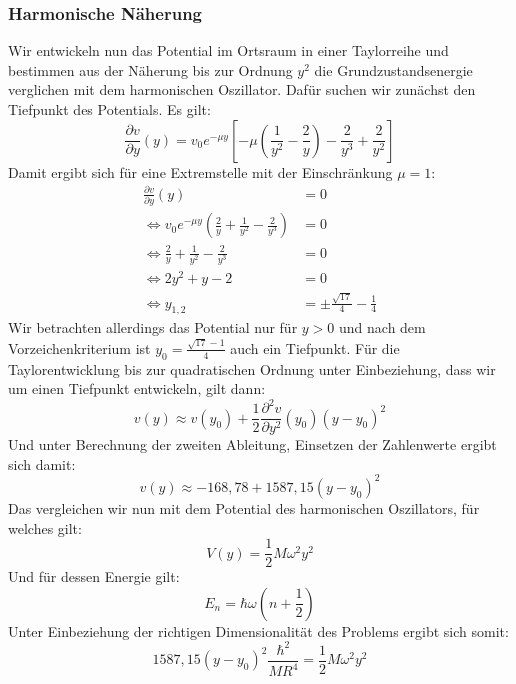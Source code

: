 \documentclass[11pt,a4paper]{article}
\begin{document}
\subsubsection*{Harmonische Näherung}
Wir entwickeln nun das Potential im Ortsraum in einer Taylorreihe und bestimmen aus der Näherung bis zur Ordnung $y^2$ die Grundzustandsenergie verglichen mit dem harmonischen Oszillator.
Dafür suchen wir zunächst den Tiefpunkt des Potentials. Es gilt:
\begin{equation*}
	\frac{\partial v}{\partial y}(y) = v_0e^{-\mu y}\left[-\mu\left(\frac{1}{y^2}-\frac{2}{y}\right)-\frac{2}{y^3}+\frac{2}{y^2}\right]
\end{equation*}
Damit ergibt sich für eine Extremstelle mit der Einschränkung $\mu = 1$:
\begin{align*}
	\frac{\partial v}{\partial y}(y) &= 0 \\
	\Leftrightarrow
	v_0e^{-\mu y}\left(\frac{2}{y}+\frac{1}{y^2}-\frac{2}{y^3}\right) &= 0 \\
	\Leftrightarrow
	\frac{2}{y}+\frac{1}{y^2}-\frac{2}{y^3} &= 0\\
	\Leftrightarrow
	2y^2 + y -2 &= 0 \\
	\Leftrightarrow
	y_{1,2} &= \pm\frac{\sqrt{17}}{4}-\frac{1}{4}
\end{align*}
Wir betrachten allerdings das Potential nur für $y>0$ und nach dem Vorzeichenkriterium ist $y_0 = \frac{\sqrt{17}-1}{4}$ auch ein Tiefpunkt. Für die Taylorentwicklung bis zur quadratischen Ordnung unter Einbeziehung, dass wir um einen Tiefpunkt entwickeln, gilt dann:
\begin{equation}
	v(y) \approx v(y_0) + \frac{1}{2}\frac{\partial^2 v}{\partial y^2}(y_0)(y-y_0)^2
\end{equation}
Und unter Berechnung der zweiten Ableitung, Einsetzen der Zahlenwerte ergibt sich damit:
\begin{equation*}
	v(y) \approx -168,78 + 1587,15(y-y_0)^2
\end{equation*}
Das vergleichen wir nun mit dem Potential des harmonischen Oszillators, für welches gilt:
\begin{equation}\label{eq:harm_pot}
	V(y) = \frac{1}{2}M\omega^2y^2
\end{equation}
Und für dessen Energie gilt:
\begin{equation}\label{eq:harm_energy}
	E_n = \hbar\omega\left(n+\frac{1}{2}\right)
\end{equation}
Unter Einbeziehung der richtigen Dimensionalität des Problems ergibt sich somit:
\begin{equation}
	1587,15(y-y_0)^2\frac{\hbar^2}{MR^4} = \frac{1}{2}M\omega^2y^2
\end{equation}
\end{document}
